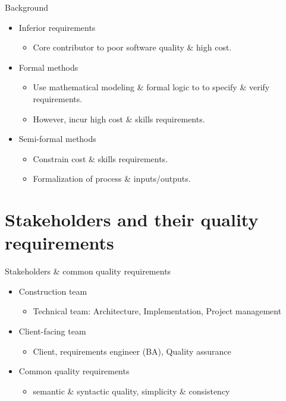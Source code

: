 \documentclass[a4]{article}
\begin{document}
\begin{frame}{Background}
  \begin{itemize} 
    \item<+-| alert@+> Inferior requirements
      \begin{itemize}
      \item Core contributor to poor software quality \& high cost.
      \end{itemize}
    \item<+-| alert@+> Formal methods
      \begin{itemize}
      \item Use mathematical modeling \& formal logic to to specify \& verify requirements.
      \item However, incur high cost \& skills requirements.
      \end{itemize}
    \item<+-| alert@+> Semi-formal methods
      \begin{itemize}
	\item Constrain cost \& skills requirements.
	\item Formalization of process \& inputs/outputs.
    
      \end{itemize}
  \end{itemize}
\end{frame}



\section{Stakeholders and their quality requirements}

\begin{frame}{Stakeholders \& common quality requirements}                      
  \begin{itemize} 
    \item<+-| alert@+> Construction team
      \begin{itemize}
	\item Technical team: Architecture, Implementation, Project management
      \end{itemize}
    \item<+-| alert@+> Client-facing team
      \begin{itemize}
	\item Client, requirements engineer (BA), Quality assurance
      \end{itemize}
    \item<+-| alert@+> Common quality requirements
      \begin{itemize}
	\item semantic \& syntactic quality, simplicity \& consistency
      \end{itemize}
  \end{itemize}
\end{frame}
\end{document}
